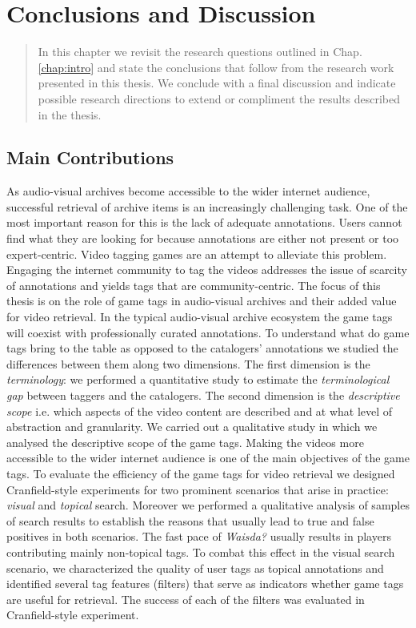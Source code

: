 \chapter{Conclusions and Discussion}\label{chap:conclusion}
\begin{quotation}
\noindent 
In this chapter we revisit the research questions outlined in Chap. \ref{chap:intro} and state the conclusions that follow from the research work presented in this thesis. We conclude with a final discussion and indicate possible research directions to extend or compliment the results described in the thesis.  
\end{quotation}

\section{Main Contributions}
As audio-visual archives become accessible to the wider internet audience, successful retrieval of archive items is an increasingly challenging task. One of the most important reason for this is the lack of adequate annotations. Users cannot find what they are looking for because annotations are either not
present or too expert-centric. Video tagging games are an attempt to alleviate this problem. Engaging the internet community to tag the videos addresses the issue of scarcity of annotations and yields tags that are community-centric. The focus of this thesis is on the role of game tags in audio-visual archives and their added value for video retrieval. In the typical audio-visual archive ecosystem the game tags will coexist with professionally curated annotations. To understand what do game tags bring to the table as opposed to the catalogers' annotations we studied the differences between them along two dimensions. The first dimension is the \textit{terminology}: we performed a quantitative study to estimate the \textit{terminological gap} between taggers and the catalogers. The second dimension is the \textit{descriptive scope} i.e. which aspects of the video content are described and at what level of abstraction and granularity. We carried out a qualitative study in which we analysed the descriptive scope of the game tags. Making the videos more accessible to the wider internet audience is one of the main objectives of the game tags. To evaluate the efficiency of the game tags for video retrieval we designed Cranfield-style experiments for two prominent scenarios that arise in practice: \textit{visual} and \textit{topical} search. Moreover we performed a qualitative analysis of samples of search results to establish the reasons that usually lead to true and false positives in both scenarios. The fast pace of \textit{Waisda?} usually results in players contributing mainly non-topical tags. To combat this effect in the visual search scenario, we characterized the quality of user tags as topical annotations and identified several tag features (filters) that serve as indicators whether game tags are useful for retrieval. The success of each of the filters was evaluated in Cranfield-style experiment.

